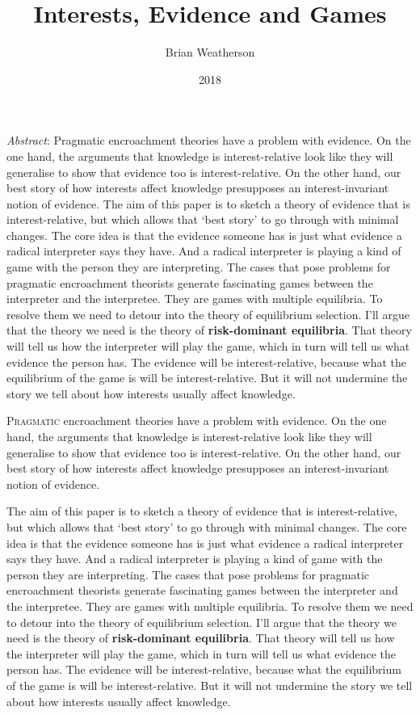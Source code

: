\documentclass[
  11pt,
  letterpaper,
  DIV=11,
  numbers=noendperiod,
  twoside]{scrartcl}
\title{Interests, Evidence and Games}
\author{Brian Weatherson}
\date{2018}
\renewenvironment{abstract}
 {\vspace{-1.25cm}
 \quotation\small\noindent\emph{Abstract}:}
 {\endquotation}
\renewenvironment{abstract}
 {\quotation\small\noindent\emph{Abstract}:}
 {\endquotation\vspace{-0.02cm}}
\begin{document}
\maketitle
\begin{abstract}
Pragmatic encroachment theories have a problem with evidence. On the one
hand, the arguments that knowledge is interest-relative look like they
will generalise to show that evidence too is interest-relative. On the
other hand, our best story of how interests affect knowledge presupposes
an interest-invariant notion of evidence. The aim of this paper is to
sketch a theory of evidence that is interest-relative, but which allows
that `best story' to go through with minimal changes. The core idea is
that the evidence someone has is just what evidence a radical
interpreter says they have. And a radical interpreter is playing a kind
of game with the person they are interpreting. The cases that pose
problems for pragmatic encroachment theorists generate fascinating games
between the interpreter and the interpretee. They are games with
multiple equilibria. To resolve them we need to detour into the theory
of equilibrium selection. I'll argue that the theory we need is the
theory of \textbf{risk-dominant equilibria}. That theory will tell us
how the interpreter will play the game, which in turn will tell us what
evidence the person has. The evidence will be interest-relative, because
what the equilibrium of the game is will be interest-relative. But it
will not undermine the story we tell about how interests usually affect
knowledge.
\end{abstract}


\lettrine{P}{ragmatic} encroachment theories have a problem with
evidence. On the one hand, the arguments that knowledge is
interest-relative look like they will generalise to show that evidence
too is interest-relative. On the other hand, our best story of how
interests affect knowledge presupposes an interest-invariant notion of
evidence.

The aim of this paper is to sketch a theory of evidence that is
interest-relative, but which allows that `best story' to go through with
minimal changes. The core idea is that the evidence someone has is just
what evidence a radical interpreter says they have. And a radical
interpreter is playing a kind of game with the person they are
interpreting. The cases that pose problems for pragmatic encroachment
theorists generate fascinating games between the interpreter and the
interpretee. They are games with multiple equilibria. To resolve them we
need to detour into the theory of equilibrium selection. I'll argue that
the theory we need is the theory of \textbf{risk-dominant equilibria}.
That theory will tell us how the interpreter will play the game, which
in turn will tell us what evidence the person has. The evidence will be
interest-relative, because what the equilibrium of the game is will be
interest-relative. But it will not undermine the story we tell about how
interests usually affect knowledge.
\end{document}
